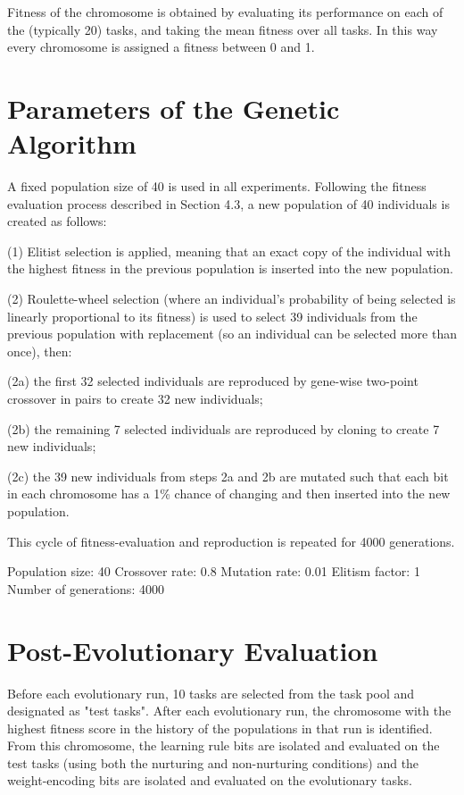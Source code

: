 \documentclass[master]{outhesis}
\begin{document}
Fitness of the chromosome is obtained by evaluating its performance on each of the (typically 20) tasks, and taking the mean fitness over all tasks. In this way every chromosome is assigned a fitness between 0 and 1.

\section{Parameters of the Genetic Algorithm}


A fixed population size of 40 is used in all experiments. Following the fitness evaluation process described in Section 4.3, a new population of 40 individuals is created as follows:

(1) Elitist selection is applied, meaning that an exact copy of the individual with the highest fitness in the previous population is inserted into the new population.

(2) Roulette-wheel selection (where an individual's probability of being selected is linearly proportional to its fitness) is used to select 39 individuals from the previous population with replacement (so an individual can be selected more than once), then:

(2a) the first 32 selected individuals are reproduced by gene-wise two-point crossover in pairs to create 32 new individuals;

(2b) the remaining 7 selected individuals are reproduced by cloning to create 7 new individuals;

(2c) the 39 new individuals from steps 2a and 2b are mutated such that each bit in each chromosome has a 1\% chance of changing and then inserted into the new population.

This cycle of fitness-evaluation and reproduction is repeated for 4000 generations.

Population size: 40
Crossover rate: 0.8
Mutation rate: 0.01
Elitism factor: 1
Number of generations: 4000

\section{Post-Evolutionary Evaluation}

Before each evolutionary run, 10 tasks are selected from the task pool and designated as "test tasks". After each evolutionary run, the chromosome with the highest fitness score in the history of the populations in that run is identified. From this chromosome, the learning rule bits are isolated and evaluated on the test tasks (using both the nurturing and non-nurturing conditions) and the weight-encoding bits are isolated and evaluated on the evolutionary tasks.
\end{document}
